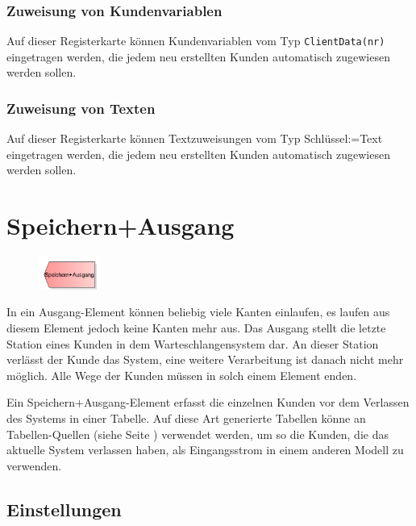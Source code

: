 \subsubsection*{Zuweisung von Kundenvariablen}

Auf dieser Registerkarte können Kundenvariablen vom Typ \texttt{ClientData(nr)} eingetragen werden,
die jedem neu erstellten Kunden automatisch zugewiesen werden sollen.

\subsubsection*{Zuweisung von Texten}

Auf dieser Registerkarte können Textzuweisungen vom Typ Schlüssel:=Text eingetragen werden,
die jedem neu erstellten Kunden automatisch zugewiesen werden sollen.


\section{Speichern+Ausgang}
\label{ref:ModelElementDisposeWithTable}

\begin{figure}
\vspace{-22pt}
\includegraphics[width=2cm]{imageModelElementDisposeWithTable.png}
\vspace{-22pt}
\end{figure}

In ein Ausgang-Element können beliebig viele Kanten einlaufen, es laufen aus diesem Element jedoch keine Kanten mehr aus.
Das Ausgang stellt die letzte Station eines Kunden in dem Warteschlangensystem dar. An dieser Station verlässt der Kunde
das System, eine weitere Verarbeitung ist danach nicht mehr möglich. Alle Wege der Kunden müssen in solch einem Element enden.

Ein Speichern+Ausgang-Element erfasst die einzelnen Kunden vor dem Verlassen des Systems in einer Tabelle. Auf diese Art
generierte Tabellen könne an Tabellen-Quellen (siehe Seite \pageref{ref:ModelElementSourceTable}) verwendet werden, um so die
Kunden, die das aktuelle System verlassen haben, als Eingangsstrom in einem anderen Modell zu verwenden.

\subsection*{Einstellungen}


